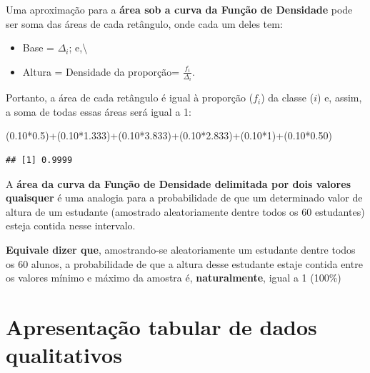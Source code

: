 \documentclass[
]{book}
\newenvironment{Shaded}{\begin{snugshade}}{\end{snugshade}}
\newcommand{\DecValTok}[1]{\textcolor[rgb]{0.00,0.00,0.81}{#1}}
\newcommand{\FloatTok}[1]{\textcolor[rgb]{0.00,0.00,0.81}{#1}}
\newcommand{\NormalTok}[1]{#1}
\newcommand{\SpecialCharTok}[1]{\textcolor[rgb]{0.00,0.00,0.00}{#1}}
\providecommand{\tightlist}{%
  \setlength{\itemsep}{0pt}\setlength{\parskip}{0pt}}
\begin{document}
\hfill\break

Uma aproximação para a \textbf{área sob a curva da Função de Densidade} pode ser soma das áreas de cada retângulo, onde cada um deles tem:

\begin{itemize}
\tightlist
\item
  Base = \(\Delta_{i}\); e,\textbackslash{}
\item
  Altura = Densidade da proporção= \(\frac{f_{i}}{\Delta_{i}}\).
\end{itemize}

Portanto, a área de cada retângulo é igual à proporção (\(f_{i}\)) da classe (\(i\)) e, assim, a soma de todas essas áreas será igual a 1:

\hfill\break

\begin{Shaded}
\begin{Highlighting}[]
\NormalTok{(}\FloatTok{0.10}\SpecialCharTok{*}\FloatTok{0.5}\NormalTok{)}\SpecialCharTok{+}\NormalTok{(}\FloatTok{0.10}\SpecialCharTok{*}\FloatTok{1.333}\NormalTok{)}\SpecialCharTok{+}\NormalTok{(}\FloatTok{0.10}\SpecialCharTok{*}\FloatTok{3.833}\NormalTok{)}\SpecialCharTok{+}\NormalTok{(}\FloatTok{0.10}\SpecialCharTok{*}\FloatTok{2.833}\NormalTok{)}\SpecialCharTok{+}\NormalTok{(}\FloatTok{0.10}\SpecialCharTok{*}\DecValTok{1}\NormalTok{)}\SpecialCharTok{+}\NormalTok{(}\FloatTok{0.10}\SpecialCharTok{*}\FloatTok{0.50}\NormalTok{)}
\end{Highlighting}
\end{Shaded}

\begin{verbatim}
## [1] 0.9999
\end{verbatim}

\hfill\break

A \textbf{área da curva da Função de Densidade delimitada por dois valores quaisquer} é uma analogia para a probabilidade de que um determinado valor de altura de um estudante (amostrado aleatoriamente dentre todos os 60 estudantes) esteja contida nesse intervalo.

\textbf{Equivale dizer que}, amostrando-se aleatoriamente um estudante dentre todos os 60 alunos, a probabilidade de que a altura desse estudante estaje contida entre os valores mínimo e máximo da amostra é, \textbf{naturalmente}, igual a 1 (100\%)

\hfill\break

\hypertarget{apresentauxe7uxe3o-tabular-de-dados-qualitativos}{%
\section{Apresentação tabular de dados qualitativos}\label{apresentauxe7uxe3o-tabular-de-dados-qualitativos}}
\end{document}
